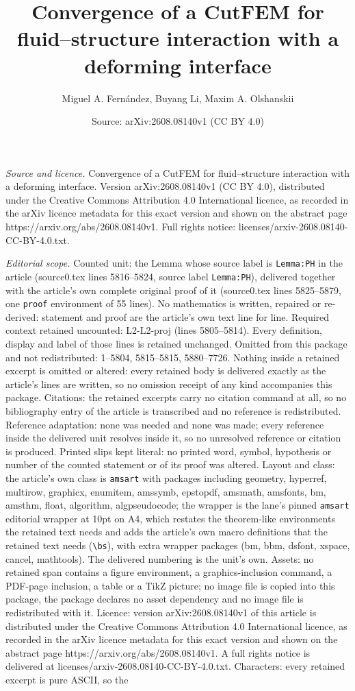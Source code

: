 \documentclass[10pt,a4paper]{amsart}
\title[Convergence of a CutFEM for fluid--structure interaction wit]{Convergence of a CutFEM for fluid--structure interaction with a deforming interface}
\author{Miguel A. Fern\'andez, Buyang Li, Maxim A. Olshanskii}
\date{Source: arXiv:2608.08140v1 (CC BY 4.0)}
\begin{document}
\maketitle

\noindent\emph{Source and licence.} Convergence of a CutFEM for fluid--structure interaction with a deforming interface. Version arXiv:2608.08140v1 (CC BY 4.0), distributed under the Creative Commons Attribution 4.0 International licence, as recorded in the arXiv licence metadata for this exact version and shown on the abstract page https://arxiv.org/abs/2608.08140v1. Full rights notice: licenses/arxiv-2608.08140-CC-BY-4.0.txt.\par\smallskip

\noindent\textit{Editorial scope.} Counted unit: the Lemma whose source label is \texttt{Lemma:PH} in the article (source0.tex lines 5816--5824, source label \texttt{Lemma:PH}), delivered together with the article's own complete original proof of it (source0.tex lines 5825--5879, one \texttt{proof} environment of 55 lines). No mathematics is written, repaired or re-derived: statement and proof are the article's own text line for line. Required context retained uncounted: L2-L2-proj (lines 5805--5814). Every definition, display and label of those lines is retained unchanged. Omitted from this package and not redistributed: 1--5804, 5815--5815, 5880--7726. Nothing inside a retained excerpt is omitted or altered: every retained body is delivered exactly as the article's lines are written, so no omission receipt of any kind accompanies this package. Citations: the retained excerpts carry no citation command at all, so no bibliography entry of the article is transcribed and no reference is redistributed. Reference adaptation: none was needed and none was made; every reference inside the delivered unit resolves inside it, so no unresolved reference or citation is produced. Printed slips kept literal: no printed word, symbol, hypothesis or number of the counted statement or of its proof was altered. Layout and class: the article's own class is \texttt{amsart} with packages including geometry, hyperref, multirow, graphicx, enumitem, amssymb, epstopdf, amsmath, amsfonts, bm, amsthm, float, algorithm, algpseudocode; the wrapper is the lane's pinned \texttt{amsart} editorial wrapper at 10pt on A4, which restates the theorem-like environments the retained text needs and adds the article's own macro definitions that the retained text needs (\texttt{\textbackslash bs}), with extra wrapper packages (bm, bbm, dsfont, xspace, cancel, mathtools). The delivered numbering is the unit's own. Assets: no retained span contains a figure environment, a graphics-inclusion command, a PDF-page inclusion, a table or a TikZ picture; no image file is copied into this package, the package declares no asset dependency and no image file is redistributed with it. Licence: version arXiv:2608.08140v1 of this article is distributed under the Creative Commons Attribution 4.0 International licence, as recorded in the arXiv licence metadata for this exact version and shown on the abstract page https://arxiv.org/abs/2608.08140v1. A full rights notice is delivered at licenses/arxiv-2608.08140-CC-BY-4.0.txt. Characters: every retained excerpt is pure ASCII, so the 
\end{document}
